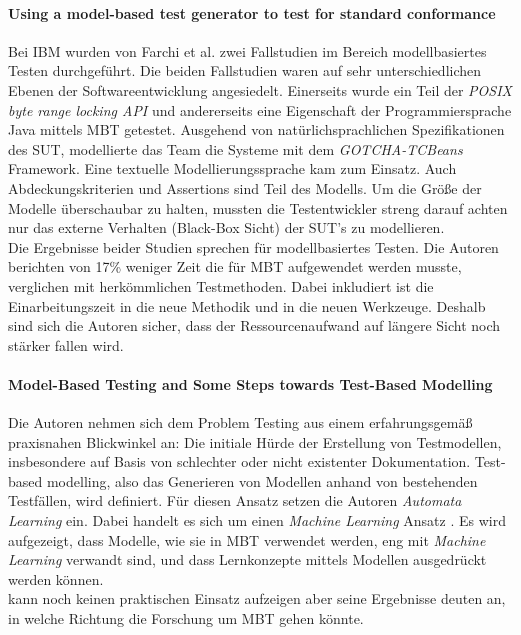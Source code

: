\paragraph{Using a model-based test generator to test for standard conformance \cite{farchi_using_2002}}\label{sec:ibm_fallstudie}
Bei IBM wurden von Farchi et al. zwei Fallstudien im Bereich modellbasiertes Testen durchgeführt. Die beiden Fallstudien waren auf sehr unterschiedlichen Ebenen der Softwareentwicklung angesiedelt. Einerseits wurde ein Teil der \textit{POSIX byte range locking API} \cite{posix_2008} und andererseits eine Eigenschaft der Programmiersprache Java mittels \Gls{MBT} getestet. Ausgehend von natürlichsprachlichen Spezifikationen des \Gls{SUT}, modellierte das Team die Systeme mit dem \textit{GOTCHA-TCBeans} Framework. Eine textuelle Modellierungssprache kam zum Einsatz. Auch Abdeckungskriterien und Assertions sind Teil des Modells. Um die Größe der Modelle überschaubar zu halten, mussten die Testentwickler streng darauf achten nur das externe Verhalten (Black-Box Sicht) der SUT's zu modellieren.\\
Die Ergebnisse beider Studien sprechen für modellbasiertes Testen. Die Autoren berichten von 17\% weniger Zeit die für \Gls{MBT} aufgewendet werden musste, verglichen mit herkömmlichen Testmethoden. Dabei inkludiert ist die Einarbeitungszeit in die neue Methodik und in die neuen Werkzeuge. Deshalb sind sich die Autoren sicher, dass der Ressourcenaufwand auf längere Sicht noch stärker fallen wird.

\paragraph{Model-Based Testing and Some Steps towards Test-Based Modelling \cite{tretmans_model-based_2011}} \label{sec:test_based_modelling} Die Autoren nehmen sich dem Problem Testing aus einem erfahrungsgemäß praxisnahen Blickwinkel an: Die initiale Hürde der Erstellung von Testmodellen, insbesondere auf Basis von schlechter oder nicht existenter Dokumentation. Test-based modelling, also das Generieren von Modellen anhand von bestehenden Testfällen, wird definiert. Für diesen Ansatz setzen die Autoren \textit{Automata Learning} ein. Dabei handelt es sich um einen \textit{Machine Learning} Ansatz \cite{narendra_learning_1974}. Es wird aufgezeigt, dass Modelle, wie sie in \Gls{MBT} verwendet werden, eng mit \textit{Machine Learning} verwandt sind, und dass Lernkonzepte mittels Modellen ausgedrückt werden können.\\
\citeauthor{tretmans_model-based_2011} kann noch keinen praktischen Einsatz aufzeigen aber seine Ergebnisse deuten an, in welche Richtung die Forschung um \Gls{MBT} gehen könnte.

